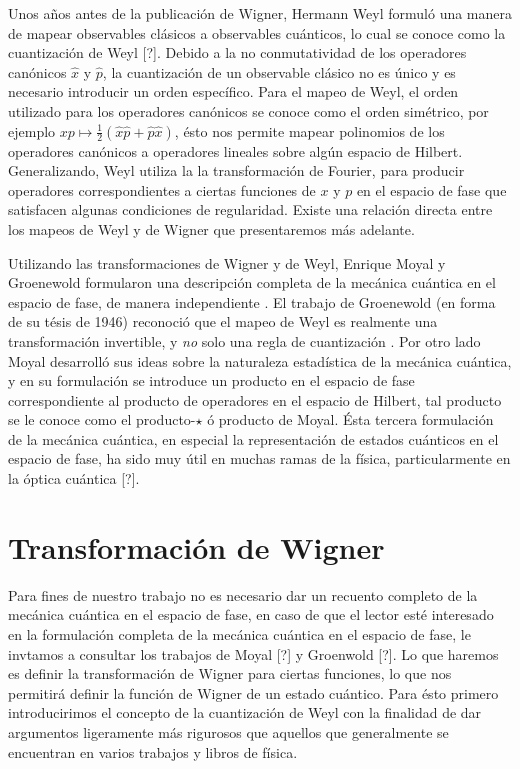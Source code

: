 \documentclass[a4paper]{report}
\begin{document}
  Unos años antes de la publicación de Wigner, Hermann Weyl
  formuló una manera de mapear observables clásicos a
  observables cuánticos, lo cual se conoce como la
  cuantización de Weyl [?]. Debido a la no conmutatividad de
  los operadores canónicos $\hat{x}$ y $\hat{p}$, la
  cuantización de un observable clásico no es único y es
  necesario introducir un orden específico. Para el mapeo de
  Weyl, el orden utilizado para los operadores canónicos se
  conoce como el orden simétrico, por ejemplo $xp \mapsto
  \frac{1}{2}\left( \hat{x} \hat{p} + \hat{p} \hat{x}
  \right)$, ésto nos permite mapear polinomios de los
  operadores canónicos a operadores lineales sobre algún
  espacio de Hilbert. Generalizando, Weyl utiliza la la
  transformación de Fourier, para producir operadores
  correspondientes a ciertas funciones de $x$ y $p$ en el
  espacio de fase que satisfacen algunas condiciones de
  regularidad. Existe una relación directa entre los mapeos
  de Weyl y de Wigner que presentaremos más adelante. 

  Utilizando las transformaciones de Wigner y de Weyl,
  Enrique Moyal y Groenewold formularon una descripción
  completa de la mecánica cuántica en el espacio de fase, de
  manera independiente
  \cite{curtrightQuantumMechanicsPhase2012}.  El trabajo de
  Groenewold (en forma de su tésis de 1946) reconoció que el
  mapeo de Weyl es realmente una transformación invertible,
  y \textit{no} solo una regla de cuantización
  \cite{todorovQuantizationMystery2012}. Por otro lado Moyal
  desarrolló sus ideas sobre la naturaleza estadística de la
  mecánica cuántica, y en su formulación se introduce un
  producto en el espacio de fase correspondiente al producto
  de operadores en el espacio de Hilbert, tal producto se le
  conoce como el producto-$\star$ ó producto de Moyal. Ésta
  tercera formulación de la mecánica cuántica, en especial
  la representación de estados cuánticos en el espacio de
  fase, ha sido muy útil en muchas ramas de la física,
  particularmente en la óptica cuántica [?].

  \section{Transformación de Wigner}

  Para fines de nuestro trabajo no es necesario dar un
  recuento completo de la mecánica cuántica en el espacio de
  fase, en caso de que el lector esté interesado en la
  formulación completa de la mecánica cuántica en el espacio
  de fase, le invtamos a consultar los trabajos de Moyal [?]
  y Groenwold [?]. Lo que haremos es definir la
  transformación de Wigner para ciertas funciones, lo que
  nos permitirá definir la función de Wigner de un estado
  cuántico. Para ésto primero introducirimos el concepto de
  la cuantización de Weyl con la finalidad de dar argumentos
  ligeramente más rigurosos que aquellos que generalmente se
  encuentran en varios trabajos y libros de física.
\end{document}
